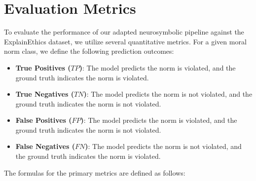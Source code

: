 \section{Evaluation Metrics}
\label{sec:evaluationMetrics}
To evaluate the performance of our adapted neurosymbolic pipeline against the ExplainEthics dataset, we utilize several quantitative metrics. For a given moral norm class, we define the following prediction outcomes:
\begin{itemize}
    \item \textbf{True Positives ($TP$)}: The model predicts the norm is violated, and the ground truth indicates the norm is violated.
    \item \textbf{True Negatives ($TN$)}: The model predicts the norm is not violated, and the ground truth indicates the norm is not violated.
    \item \textbf{False Positives ($FP$)}: The model predicts the norm is violated, and the ground truth indicates the norm is not violated.
    \item \textbf{False Negatives ($FN$)}: The model predicts the norm is not violated, and the ground truth indicates the norm is violated.
\end{itemize}
The formulas for the primary metrics are defined as follows:

